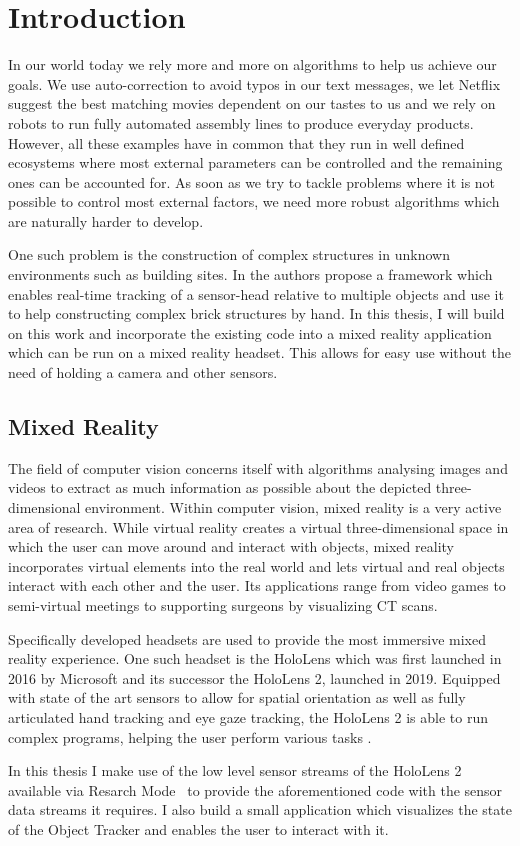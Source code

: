 \setcounter{chapter}{0}

\chapter{Introduction}

In our world today we rely more and more on algorithms to help us achieve our goals. We use auto-correction to avoid typos in our text messages, we let Netflix suggest the best matching movies dependent on our tastes to us and we rely on robots to run fully automated assembly lines to produce everyday products. However, all these examples have in common that they run in well defined ecosystems where most external parameters can be controlled and the remaining ones can be accounted for. As soon as we try to tackle problems where it is not possible to control most external factors, we need more robust algorithms which are naturally harder to develop.

One such problem is the construction of complex structures in unknown environments such as building sites. In \cite{ViObjectTracker} the authors propose a framework which enables real-time tracking of a sensor-head relative to multiple objects and use it to help constructing complex brick structures by hand. In this thesis, I will build on this work and incorporate the existing code into a mixed reality application which can be run on a mixed reality headset. This allows for easy use without the need of holding a camera and other sensors.

\section{Mixed Reality}

The field of computer vision concerns itself with algorithms analysing images and videos to extract as much information as possible about the depicted three-dimensional environment. Within computer vision, mixed reality is a very active area of research. While virtual reality creates a virtual three-dimensional space in which the user can move around and interact with objects, mixed reality incorporates virtual elements into the real world and lets virtual and real objects interact with each other and the user. Its applications range from video games to semi-virtual meetings to supporting surgeons by visualizing CT scans.

Specifically developed headsets are used to provide the most immersive mixed reality experience. One such headset is the HoloLens which was first launched in 2016 by Microsoft and its successor the HoloLens 2, launched in 2019. Equipped with state of the art sensors to allow for spatial orientation as well as fully articulated hand tracking and eye gaze tracking, the HoloLens 2 is able to run complex programs, helping the user perform various tasks \cite{HololensHardware}. 

In this thesis I make use of the low level sensor streams of the HoloLens 2 available via Resarch Mode~\cite{ResearchMode} to provide the aforementioned code with the sensor data streams it requires. I also build a small application which visualizes the state of the Object Tracker and enables the user to interact with it.